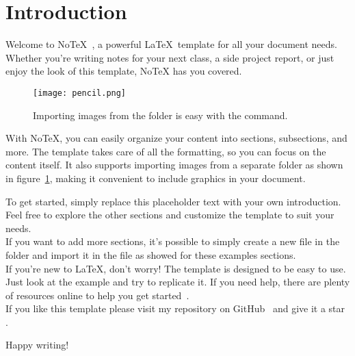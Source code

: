 \documentclass[../main.tex]{subfiles}
\begin{document}
\section{Introduction}

Welcome to NoTeX~\cite{github}, a powerful \LaTeX\ template for all your document needs. Whether you're writing notes for your next class, a side project report, or just enjoy the look of this template, NoTeX has you covered.

\begin{figure}[H]
    \centering
    \texttt{[image: pencil.png]}
    \caption{Importing images from the  folder is easy with the  command.}
    \label{fig:notex-logo}
\end{figure}

With NoTeX, you can easily organize your content into sections, subsections, and more. The template takes care of all the formatting, so you can focus on the content itself. It also supports importing images from a separate folder as shown in figure~\ref{fig:notex-logo}, making it convenient to include graphics in your document.

To get started, simply replace this placeholder text with your own introduction. Feel free to explore the other sections and customize the template to suit your needs.\\
If you want to add more sections, it's possible to simply create a new 
file in the  folder and import it in the  file as
showed for these examples sections.\\

If you're new to \LaTeX, don't worry! The template is designed to be easy to use. Just look at the example and try to replicate it. If you need help, there are plenty of resources online to help you get started~\cite{overleaf}.\\

If you like this template please visit my repository on GitHub~\cite{github} and give it a star .\\

\begin{cbox}
\begin{center}
	 \; \href{https://github.com/marcotallone/notex}{}
\end{center}
\end{cbox}

Happy writing!
\end{document}
